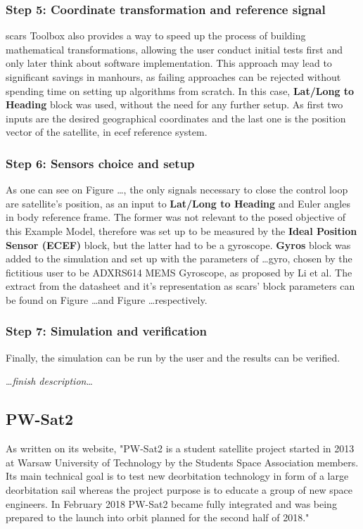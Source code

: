         \subsubsection*{Step 5: Coordinate transformation and reference signal}
            \ac{scars} Toolbox also provides a way to speed up the process of building mathematical transformations, allowing the user conduct initial tests first and only later think about software implementation. This approach may lead to significant savings in manhours, as failing approaches can be rejected without spending time on setting up algorithms from scratch. In this case, \textbf{Lat/Long to Heading} block was used, without the need for any further setup. As first two inputs are the desired geographical coordinates and the last one is the position vector of the satellite, in \ac{ecef} reference system. 

        \subsubsection*{Step 6: Sensors choice and setup}
            As one can see on Figure \dots, the only signals necessary to close the control loop are satellite's position, as an input to \textbf{Lat/Long to Heading} and Euler angles in body reference frame. The former was not relevant to the posed objective of this Example Model, therefore was set up to be measured by the \textbf{Ideal Position Sensor (ECEF)} block, but the latter had to be a gyroscope. \textbf{Gyros} block was added to the simulation and set up with the parameters of \dots gyro, chosen by the fictitious user to be ADXRS614 MEMS Gyroscope, as proposed by Li et al.\cite{li2013design} The extract from the datasheet and it's representation as \ac{scars}' block parameters can be found on Figure \dots and Figure \dots respectively.

        \subsubsection*{Step 7: Simulation and verification}
            Finally, the simulation can be run by the user and the results can be verified. 
 
        \dots\textit{finish description}\dots

    \subsection{PW-Sat2}
        As written on its website, "PW-Sat2 is a student satellite project started in 2013 at Warsaw University of Technology by the Students Space Association members. Its main technical goal is to test new deorbitation technology in form of a large deorbitation sail whereas the project purpose is to educate a group of new space engineers. In February 2018 PW-Sat2 became fully integrated and was being prepared to the launch into orbit planned for the second half of 2018."\cite{pwsat2website}
        
